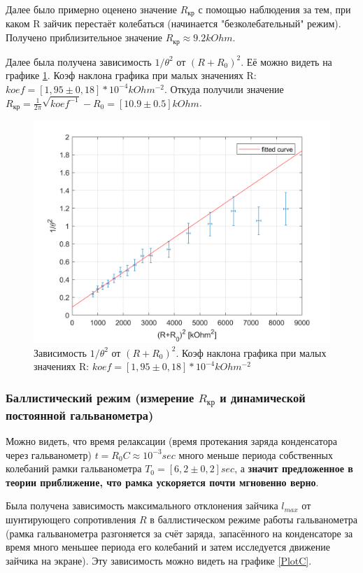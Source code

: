 \documentclass[a4paper,12pt]{article}
\begin{document}
Далее было примерно оценено значение $R_\text{кр}$ с помощью наблюдения за тем, при каком R зайчик перестаёт колебаться (начинается "безколебательный" режим). Получено приблизительное значение \textbf{$R_\text{кр} \approx 9.2 kOhm$}.

Далее была получена зависимость $1/\theta^2$ от $(R+R_0)^2$. Её можно видеть на графике \ref{PlotB}. Коэф наклона графика при малых значениях R: $koef = [1,95 \pm 0,18]*10^{-4} kOhm^{-2}$. Откуда получили значение \textbf{$R_\text{кр} = \frac{1}{2\pi}\sqrt{koef^{-1}} - R_0 = [10.9 \pm 0.5] kOhm$}.


\begin{figure}[h!]
   \centering
   \includegraphics[width=12cm]{PlotB.png} 
   \caption{Зависимость $1/\theta^2$ от $(R+R_0)^2$. Коэф наклона графика при малых значениях R: $koef = [1,95 \pm 0,18]*10^{-4} kOhm^{-2}$} 
   \label{PlotB} 
   \end{figure}
   
\subsubsection*{Баллистический режим (измерение $R_\text{кр}$ и динамической постоянной гальванометра)}
\bigskip

Можно видеть, что время релаксации (время протекания заряда конденсатора через гальванометр) $t = R_0C \approx 10^{-3}sec$ много меньше периода собственных колебаний рамки гальванометра $T_0 = [6,2 \pm 0,2]sec$, а \textbf{значит предложенное в теории приближение, что рамка ускоряется почти мгновенно верно}.

Была получена зависимость максимального отклонения зайчика $l_{max}$ от шунтирующего сопротивления $R$  в баллистическом режиме работы гальванометра (рамка гальванометра разгоняется за счёт заряда, запасённого на конденсаторе за время много меньшее периода его колебаний и затем исследуется движение зайчика на экране). Эту зависимость можно видеть на графике \ref{PlotC}.
\end{document}
